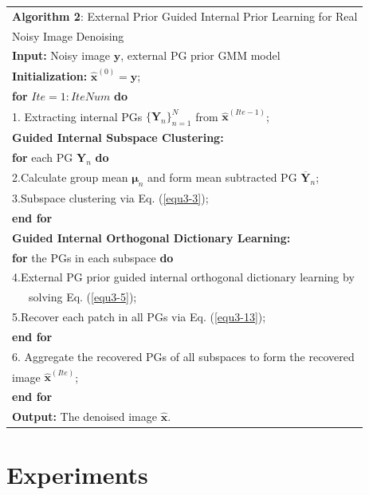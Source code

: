 \vspace{3mm}
\begin{table}[htpb]
\label{alg3-2}
\begin{tabular}{l}
\hline
\textbf{Algorithm 2}: External Prior Guided Internal Prior Learning for Real 
\\
\quad \quad \quad \quad \quad \quad Noisy Image Denoising
\\
\hline
\textbf{Input:} Noisy image $\mathbf{y}$, external PG prior GMM model
\\
\textbf{Initialization:} $\hat{\mathbf{x}}^{(0)}=\mathbf{y}$;
\\
\textbf{for} $Ite = 1:IteNum$ \textbf{do}
\\
1. Extracting internal PGs $\{\bm{Y}_{n}\}_{n=1}^{N}$ from $\hat{\mathbf{x}}^{(Ite-1)}$;
\\
\textbf{Guided Internal Subspace Clustering:}
\\
\quad\textbf{for} each PG $\bm{Y}_{n}$ \textbf{do}
\\
2.\quad Calculate group mean $\bm{\mu}_{n}$ and form mean subtracted PG $\bm{\overline{Y}}_{n}$;
\\
3.\quad Subspace clustering via Eq. (\ref{equ3-3});
\\
\quad\textbf{end for}
\\
\textbf{Guided Internal Orthogonal Dictionary Learning:}
\\
\quad\textbf{for} the PGs in each subspace \textbf{do}
\\
4.\quad External PG prior guided internal orthogonal dictionary learning by
\\
\quad \ \ \ solving Eq. (\ref{equ3-5});
\\
5.\quad Recover each patch in all PGs via Eq. (\ref{equ3-13});
\\
\quad\textbf{end for}
\\
6. Aggregate the recovered PGs of all subspaces to form the recovered 
\\
\quad image $\hat{\mathbf{x}}^{(Ite)}$;
\\
\textbf{end for}
\\
\textbf{Output:} The denoised image $\hat{\mathbf{x}}$.
\\
\hline
\end{tabular}
\end{table}

\section{Experiments}

